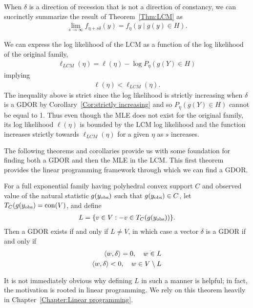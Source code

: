 When $\delta$ is a direction of recession that is not a direction of constancy, 
we can succinctly summarize the result of Theorem~\ref{Thm:LCM} as
\begin{align*}
\lim_{s \to \infty} f_{\eta+s\delta}(y) = f_{\eta}( y \mid g(y) \in H).
\end{align*}

We can express the log likelihood of the LCM as a function of the 
log likelihood of the original family,
\begin{align} \label{E:LCM ll bound}
 \ell_{LCM}(\eta) = \ell(\eta) - \log P_\eta(g(Y) \in H)
\end{align}
implying
\begin{align*}
	\ell(\eta) < \ell_{LCM}(\eta).	
\end{align*}
The inequality above is strict since the log likelihood is strictly increasing
when $\delta$ is a GDOR by Corollary~\ref{Cor:strictly increasing}
and so $P_\eta(g(Y) \in H)$ cannot be equal to 1.
Thus even though the MLE does not exist for the original family, its log likelihood
$\ell(\eta)$ is bounded by the LCM log likelihood and the function increases strictly
towards $\ell_{LCM}(\eta)$ for a given $\eta$ as $s$ increases.





The following theorems and corollaries provide us with some foundation for
finding both a GDOR and then the MLE in the LCM.
This first theorem provides the linear programming framework through
which we can find a GDOR.  
\begin{theorem} \label{Thm:L-GDOR}
For a full exponential family having polyhedral convex support $C$ and observed value 
of the natural statistic $g(y_{\text{obs}})$ such that $g(y_{\text{obs}}) \in C$, 
let $T_C(g(y_{\text{obs}}) = \operatorname{con}(V)$, and define
\begin{align*}
	L = \{ v \in V: -v \in T_C(g(y_{\text{obs}})) \}.
\end{align*}
Then a GDOR exists if and only if $L \neq V$, in which case a vector $\delta$ is a GDOR if and 
only if
\begin{align*}
	\langle w, \delta \rangle = 0, \quad w \in L \\
	\langle w, \delta \rangle < 0, \quad w \in V \setminus L \\
\end{align*}
\end{theorem}
It is not immediately obvious why defining $L$ in such a manner is helpful; in fact,
the motivation is rooted in linear programming.  We rely on this theorem heavily in 
Chapter~\ref{Chapter:Linear programming}.

